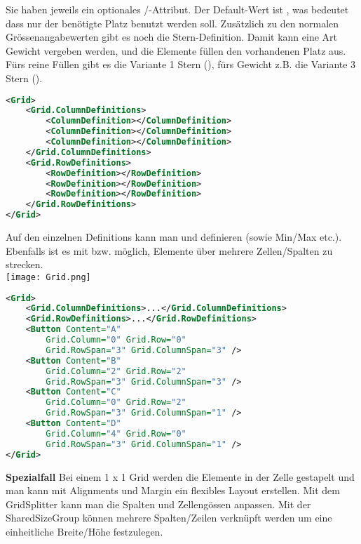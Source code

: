 Sie haben jeweils ein optionales /-Attribut. Der Default-Wert ist , was bedeutet dass nur der benötigte Platz benutzt werden soll. Zusätzlich zu den normalen Grössenangabewerten gibt es noch die Stern-Definition. Damit kann eine Art Gewicht vergeben werden, und die Elemente füllen den vorhandenen Platz aus. Fürs reine Füllen gibt es die Variante 1 Stern (), fürs Gewicht z.B. die Variante 3 Stern ().
\begin{lstlisting}[language=xml, caption="3 x 3 Grid"]
<Grid>
    <Grid.ColumnDefinitions>
        <ColumnDefinition></ColumnDefinition>
        <ColumnDefinition></ColumnDefinition>
        <ColumnDefinition></ColumnDefinition>
    </Grid.ColumnDefinitions>
    <Grid.RowDefinitions>
        <RowDefinition></RowDefinition>
        <RowDefinition></RowDefinition>
        <RowDefinition></RowDefinition>
    </Grid.RowDefinitions>
</Grid>
\end{lstlisting}
Auf den einzelnen Definitions kann man  und  definieren (sowie Min/Max etc.). Ebenfalls ist es mit  bzw.  möglich, Elemente über mehrere Zellen/Spalten zu strecken. \\
\texttt{[image: Grid.png]}
\begin{lstlisting}[language=xml]
<Grid>
    <Grid.ColumnDefinitions>...</Grid.ColumnDefinitions>
    <Grid.RowDefinitions>...</Grid.RowDefinitions>
    <Button Content="A"
        Grid.Column="0" Grid.Row="0"
        Grid.RowSpan="3" Grid.ColumnSpan="3" />
    <Button Content="B"
        Grid.Column="2" Grid.Row="2"
        Grid.RowSpan="3" Grid.ColumnSpan="3" />
    <Button Content="C"
        Grid.Column="0" Grid.Row="2"
        Grid.RowSpan="3" Grid.ColumnSpan="1" />
    <Button Content="D"
        Grid.Column="4" Grid.Row="0"
        Grid.RowSpan="3" Grid.ColumnSpan="1" />
</Grid>
\end{lstlisting}
\textbf{Spezialfall} Bei einem 1 x 1 Grid werden die Elemente in der Zelle gestapelt und man kann mit Alignments und Margin ein flexibles Layout erstellen. Mit dem GridSplitter kann man die Spalten und Zellengössen anpassen. Mit der SharedSizeGroup können mehrere Spalten/Zeilen verknüpft werden um eine einheitliche Breite/Höhe festzulegen.
